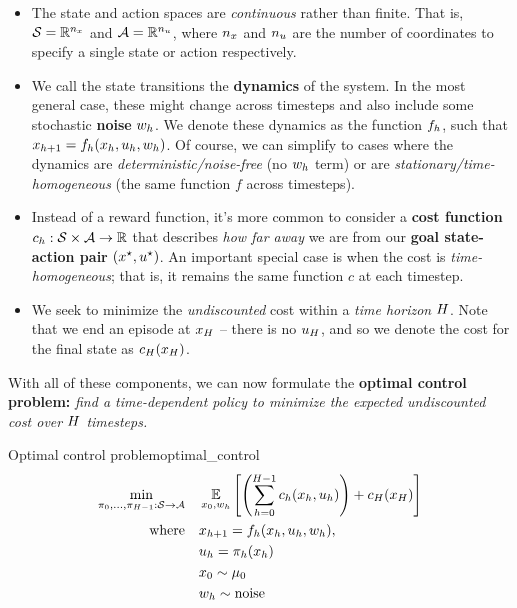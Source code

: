 \documentclass[\main/main]{subfiles}
\begin{document}
\begin{itemize}
    \item The state and action spaces are \emph{continuous} rather than finite. That is, $\mathcal{S} = \mathbb{R}^{n_x}$ and $\mathcal{A} = \mathbb{R}^{n_u}$, where $n_x$ and $n_u$ are the number of coordinates to specify a single state or action respectively.
    \item We call the state transitions the \textbf{dynamics} of the system. In the most general case, these might change across timesteps and also include some stochastic \textbf{noise} $w_h$. We denote these dynamics as the function $f_h$, such that $x_{h+1} = f_h(x_h, u_h, w_h)$. Of course, we can simplify to cases where the dynamics are \emph{deterministic/noise-free} (no $w_h$ term) or are \emph{stationary/time-homogeneous} (the same function $f$ across timesteps).
    \item Instead of a reward function, it's more common to consider a \textbf{cost function} $c_h: \mathcal{S} \times \mathcal{A} \to \mathbb{R}$ that describes \emph{how far away} we are from our \textbf{goal state-action pair} $(x^\star, u^\star)$. An important special case is when the cost is \emph{time-homogeneous}; that is, it remains the same function $c$ at each timestep.
    \item We seek to minimize the \emph{undiscounted} cost within a \emph{time horizon} $H$. Note that we end an episode at $x_H$ -- there is no $u_H$, and so we denote the cost for the final state as $c_H(x_H)$.
\end{itemize}

With all of these components, we can now formulate the \textbf{optimal control problem:} \emph{find a time-dependent policy to minimize the expected undiscounted cost over $H$ timesteps.}

\begin{definition}{Optimal control problem}{optimal_control}
    \begin{equation}
        \begin{split}
            \min_{\pi_0, \dots, \pi_{H-1} : \mathcal{S} \to \mathcal{A}} \quad & \operatorname*{\mathbb{E}}_{x_0, w_h} \left[
                \left( \sum_{h=0}^{H-1} c_h(x_h, u_h) \right) + c_H(x_H)
            \right] \\
            \text{where} \quad & x_{h+1} = f_h(x_h, u_h, w_h), \\
            & u_h = \pi_h(x_h) \\
            & x_0 \sim \mu_0 \\
            & w_h \sim \text{noise}
        \end{split}
    \end{equation}
\end{definition}
\end{document}
